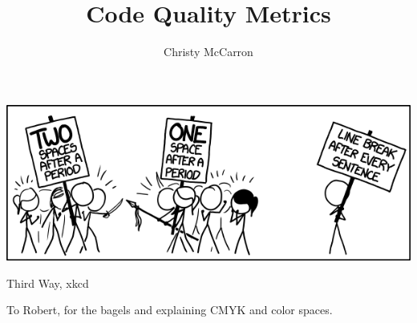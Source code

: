 \documentclass[sigconf, nonacm]{acmart}
\begin{document}
\title{Code Quality Metrics}


\author{Christy McCarron}


\begin{abstract}

\end{abstract}


\begin{teaserfigure}
  \includegraphics[width=\textwidth]{images/third_way.png}
  \caption{Third Way, xkcd}
  \label{fig:thirdWay}
\end{teaserfigure}

\maketitle








\begin{acks}
To Robert, for the bagels and explaining CMYK and color spaces.
\end{acks}




\appendix


\end{document}
